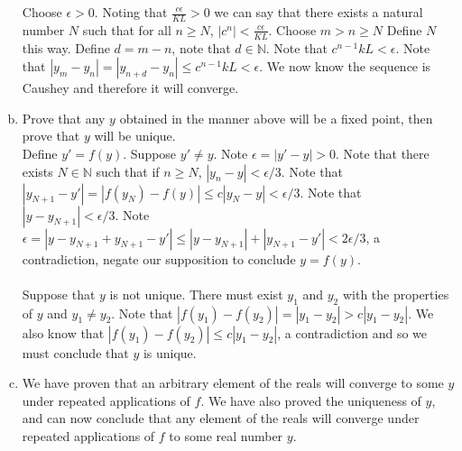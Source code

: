 \documentclass[12pt]{article}
\theoremstyle{homework}
\begin{document}
\begin{enumerate}[(a)]
Choose $\epsilon>0$.  Noting that $\frac{c\epsilon}{KL}>0$ we can say that there exists a natural number $N$ such that for all $n\geq N$, $|c^n|<\frac{c\epsilon}{KL}$.  Choose $m>n\geq N$ Define $N$ this way.  Define $d=m-n$, note that $d\in\mathbb{N}$.  Note that $c^{n-1}kL<\epsilon$.  Note that $|y_m - y_n|=|y_{n+d} - y_n|\leq c^{n-1}kL<\epsilon$.  We now know the sequence is Caushey and therefore it will converge.
\item
Prove that any $y$ obtained in the manner above will be a fixed point, then prove that $y$ will be unique.\\
Define $y'=f(y)$.  Suppose $y'\neq y$.  Note $\epsilon=|y'-y|>0$.  Note that there exists $N\in\mathbb{N}$ such that if $n\geq N$, $|y_n-y|<\epsilon/3$.  Note that $|y_{N+1}-y'|=|f(y_N)-f(y)|\leq c|y_N-y|<\epsilon/3$.  Note that $|y-y_{N+1}|<\epsilon/3$.  Note $\epsilon=|y-y_{N+1}+y_{N+1}-y'|\leq |y-y_{N+1}|+|y_{N+1}-y'|<2\epsilon/3$, a contradiction, negate our supposition to conclude $y=f(y)$.\\\\
Suppose that $y$ is not unique.  There must exist $y_1$ and $y_2$ with the properties of $y$ and $y_1\neq y_2$.  Note that $|f(y_1)-f(y_2)|=|y_1-y_2|>c|y_1-y_2|$.  We also know that $|f(y_1)-f(y_2)|\leq c|y_1-y_2|$, a contradiction and so we must conclude that $y$ is unique.
\item
We have proven that an arbitrary element of the reals will converge to some $y$ under repeated applications of $f$.  We have also proved the uniqueness of $y$, and can now conclude that any element of the reals will converge under repeated applications of $f$ to some real number $y$.
\end{enumerate}
\end{document}
